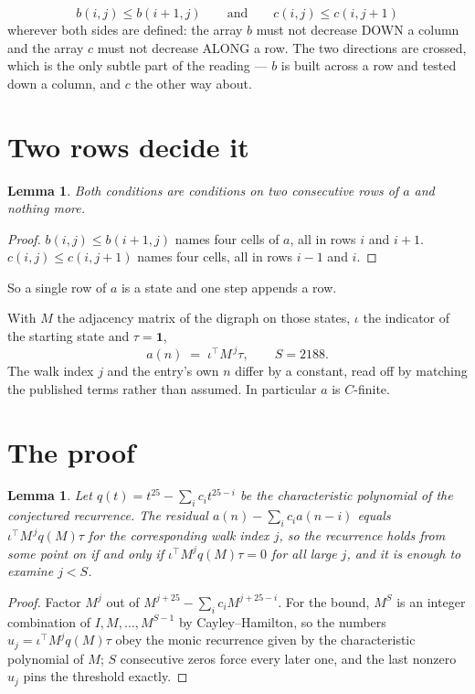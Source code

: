 \documentclass[11pt,a4paper]{article}
\theoremstyle{plain}
\newtheorem{lemma}[theorem]{Lemma}
\theoremstyle{definition}
\begin{document}
\[
b(i,j)\le b(i{+}1,j)\qquad\text{and}\qquad c(i,j)\le c(i,j{+}1)
\]
wherever both sides are defined: the array $b$ must not decrease DOWN a column and the array
$c$ must not decrease ALONG a row. The two directions are crossed, which is the only subtle
part of the reading --- $b$ is built across a row and tested down a column, and $c$ the other
way about.


\section{Two rows decide it}

\begin{lemma}\label{lem:win}
Both conditions are conditions on two consecutive rows of $a$ and nothing more.
\end{lemma}

\begin{proof}
$b(i,j)\le b(i{+}1,j)$ names four cells of $a$, all in rows $i$ and $i+1$. $c(i,j)\le
c(i,j{+}1)$ names four cells, all in rows $i-1$ and $i$.
\end{proof}

So a single row of $a$ is a state and one step appends a row.

With $M$ the adjacency matrix of the digraph on those states, $\iota$ the indicator of the
starting state and $\tau=\mathbf{1}$,
\[
a(n)\;=\;\iota^{\!\top}M^{\,j}\tau ,\qquad S=2188.
\]
The walk index $j$ and the entry's own $n$ differ by a constant, read off by matching the
published terms rather than assumed. In particular $a$ is $C$-finite.

\section{The proof}

\begin{lemma}\label{lem:crit}
Let $q(t)=t^{25}-\sum_i c_it^{25-i}$ be the characteristic polynomial of the
conjectured recurrence. The residual $a(n)-\sum_ic_ia(n-i)$ equals
$\iota^{\!\top}M^{\,j}q(M)\tau$ for the corresponding walk index $j$, so the recurrence
holds from some point on if and only if $\iota^{\!\top}M^{j}q(M)\tau=0$ for all large $j$,
and it is enough to examine $j<S$.
\end{lemma}

\begin{proof}
Factor $M^{j}$ out of $M^{j+25}-\sum_ic_iM^{j+25-i}$. For the bound, $M^{S}$
is an integer combination of $I,M,\dots,M^{S-1}$ by Cayley--Hamilton, so the numbers
$u_j=\iota^{\!\top}M^{j}q(M)\tau$ obey the monic recurrence given by the characteristic
polynomial of $M$; $S$ consecutive zeros force every later one, and the last nonzero $u_j$
pins the threshold exactly.
\end{proof}
\end{document}
